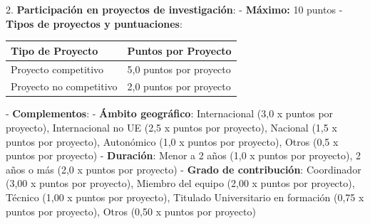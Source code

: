 \documentclass{article}
\begin{document}
\begin{itemize}
\begin{itemize}
                2. \textbf{Participación en proyectos de investigación}:
                - \textbf{Máximo:} 10 puntos
                - \textbf{Tipos de proyectos y puntuaciones}:
                \vspace{0.4cm}
                \begin{table}[h!]\centering\renewcommand{\arraystretch}{1.3}
                  \begin{tabular}{|p{}|p{}|}\hline
                    Tipo de Proyecto        & Puntos por Proyecto     \\\hline
                    Proyecto competitivo    & 5,0 puntos por proyecto \\\hline
                    Proyecto no competitivo & 2,0 puntos por proyecto \\\hline
                  \end{tabular}\end{table}
                \vspace{0.4cm}
                - \textbf{Complementos}:
                - \textbf{Ámbito geográfico}: Internacional (3,0 x puntos por proyecto), Internacional no UE (2,5 x puntos por proyecto), Nacional (1,5 x puntos por proyecto), Autonómico (1,0 x puntos por proyecto), Otros (0,5 x puntos por proyecto)
                - \textbf{Duración}: Menor a 2 años (1,0 x puntos por proyecto), 2 años o más (2,0 x puntos por proyecto)
                - \textbf{Grado de contribución}: Coordinador (3,00 x puntos por proyecto), Miembro del equipo (2,00 x puntos por proyecto), Técnico (1,00 x puntos por proyecto), Titulado Universitario en formación (0,75 x puntos por proyecto), Otros (0,50 x puntos por proyecto)


\end{itemize}
\end{itemize}
\end{document}

